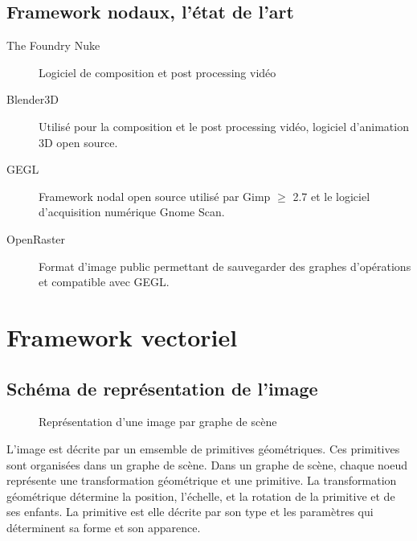 		\subsection{Framework nodaux, l'état de l'art}
			\begin{description}
				\item[The Foundry Nuke]Logiciel de composition et post processing vidéo
				\item[Blender3D]Utilisé pour la composition et le post processing vidéo, logiciel d'animation 3D open source.
				\item[GEGL]Framework nodal open source utilisé par Gimp $\geq$ 2.7 et le logiciel d'acquisition numérique Gnome Scan.
				\item[OpenRaster]Format d'image public permettant de sauvegarder des graphes d'opérations et compatible avec GEGL.
			\end{description}

	\section{Framework vectoriel}
		\subsection{Schéma de représentation de l'image}
			\begin{figure}[h]
				\centering
				\caption{Représentation d'une image par graphe de scène}
				\label{fig:editnodal}
			\end{figure}
			L'image est décrite par un emsemble de primitives géométriques. Ces primitives sont organisées dans un graphe de scène. Dans un 
			graphe de scène, chaque noeud représente une transformation géométrique et une primitive. La transformation géométrique détermine
			la position, l'échelle, et la rotation de la primitive et de ses enfants. La primitive est elle décrite par son type et les paramètres
			qui déterminent sa forme et son apparence.

